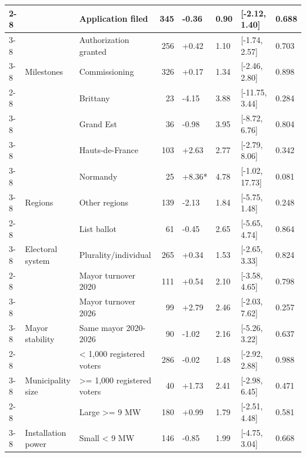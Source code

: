 \begin{ThreePartTable}
\begin{longtable}[t]{lllrllll}
\cmidrule{2-8}\nopagebreak
 &  & Application filed & 345 & -0.36 & 0.90 & {}[-2.12, 1.40] & 0.688\\
\cmidrule{3-8}\nopagebreak
 &  & Authorization granted & 256 & +0.42 & 1.10 & {}[-1.74, 2.57] & 0.703\\
\cmidrule{3-8}\nopagebreak
 & \multirow[t]{-3}{*}{\raggedright\arraybackslash Milestones} & Commissioning & 326 & +0.17 & 1.34 & {}[-2.46, 2.80] & 0.898\\
\cmidrule{2-8}\nopagebreak
 &  & Brittany & 23 & -4.15 & 3.88 & {}[-11.75, 3.44] & 0.284\\
\cmidrule{3-8}\nopagebreak
 &  & Grand Est & 36 & -0.98 & 3.95 & {}[-8.72, 6.76] & 0.804\\
\cmidrule{3-8}\nopagebreak
 &  & Hauts-de-France & 103 & +2.63 & 2.77 & {}[-2.79, 8.06] & 0.342\\
\cmidrule{3-8}\nopagebreak
 &  & Normandy & 25 & +8.36* & 4.78 & {}[-1.02, 17.73] & 0.081\\
\cmidrule{3-8}\nopagebreak
 & \multirow[t]{-5}{*}{\raggedright\arraybackslash Regions} & Other regions & 139 & -2.13 & 1.84 & {}[-5.75, 1.48] & 0.248\\
\cmidrule{2-8}\nopagebreak
 &  & List ballot & 61 & -0.45 & 2.65 & {}[-5.65, 4.74] & 0.864\\
\cmidrule{3-8}\nopagebreak
 & \multirow[t]{-2}{*}{\raggedright\arraybackslash Electoral system} & Plurality/individual & 265 & +0.34 & 1.53 & {}[-2.65, 3.33] & 0.824\\
\cmidrule{2-8}\nopagebreak
 &  & Mayor turnover 2020 & 111 & +0.54 & 2.10 & {}[-3.58, 4.65] & 0.798\\
\cmidrule{3-8}\nopagebreak
 &  & Mayor turnover 2026 & 99 & +2.79 & 2.46 & {}[-2.03, 7.62] & 0.257\\
\cmidrule{3-8}\nopagebreak
 & \multirow[t]{-3}{*}{\raggedright\arraybackslash Mayor stability} & Same mayor 2020-2026 & 90 & -1.02 & 2.16 & {}[-5.26, 3.22] & 0.637\\
\cmidrule{2-8}\nopagebreak
 &  & < 1,000 registered voters & 286 & -0.02 & 1.48 & {}[-2.92, 2.88] & 0.988\\
\cmidrule{3-8}\nopagebreak
 & \multirow[t]{-2}{*}{\raggedright\arraybackslash Municipality size} & >= 1,000 registered voters & 40 & +1.73 & 2.41 & {}[-2.98, 6.45] & 0.471\\
\cmidrule{2-8}\nopagebreak
 &  & Large >= 9 MW & 180 & +0.99 & 1.79 & {}[-2.51, 4.48] & 0.581\\
\cmidrule{3-8}\nopagebreak
 & \multirow[t]{-2}{*}{\raggedright\arraybackslash Installation power} & Small < 9 MW & 146 & -0.85 & 1.99 & {}[-4.75, 3.04] & 0.668\\

\end{longtable}
\end{ThreePartTable}
